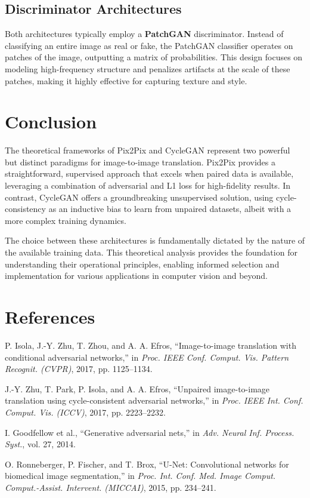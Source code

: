 \documentclass[journal]{IEEEtran}
\begin{document}
\subsection{Discriminator Architectures}

 Both architectures typically employ a \textbf{PatchGAN} discriminator.
 Instead of classifying an entire image as real or fake, the PatchGAN
 classifier operates on patches of the image, outputting a matrix of
 probabilities. This design focuses on modeling high-frequency structure
 and penalizes artifacts at the scale of these patches, making it highly
 effective for capturing texture and style.

\section{Conclusion}

 The theoretical frameworks of Pix2Pix and CycleGAN represent two powerful
 but distinct paradigms for image-to-image translation. Pix2Pix provides
 a straightforward, supervised approach that excels when paired data is
 available, leveraging a combination of adversarial and L1 loss for
 high-fidelity results. In contrast, CycleGAN offers a groundbreaking
 unsupervised solution, using cycle-consistency as an inductive bias to
 learn from unpaired datasets, albeit with a more complex training
 dynamics.

 The choice between these architectures is fundamentally dictated by the
 nature of the available training data. This theoretical analysis provides
 the foundation for understanding their operational principles, enabling
 informed selection and implementation for various applications in
 computer vision and beyond.

\section*{References}
\begin{thebibliography}{00}

P. Isola, J.-Y. Zhu, T. Zhou, and A. A. Efros, ``Image-to-image translation with conditional adversarial networks,'' in \emph{Proc. IEEE Conf. Comput. Vis. Pattern Recognit. (CVPR)}, 2017, pp. 1125--1134.

J.-Y. Zhu, T. Park, P. Isola, and A. A. Efros, ``Unpaired image-to-image translation using cycle-consistent adversarial networks,'' in \emph{Proc. IEEE Int. Conf. Comput. Vis. (ICCV)}, 2017, pp. 2223--2232.

I. Goodfellow et al., ``Generative adversarial nets,'' in \emph{Adv. Neural Inf. Process. Syst.}, vol. 27, 2014.

O. Ronneberger, P. Fischer, and T. Brox, ``U-Net: Convolutional networks for biomedical image segmentation,'' in \emph{Proc. Int. Conf. Med. Image Comput. Comput.-Assist. Intervent. (MICCAI)}, 2015, pp. 234--241.

\end{thebibliography}
\end{document}
